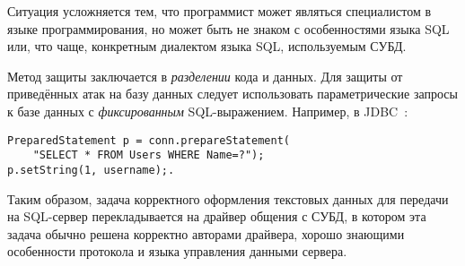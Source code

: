 Ситуация усложняется тем, что программист может являться специалистом в языке программирования, но может быть не знаком с особенностями языка SQL или, что чаще, конкретным диалектом языка SQL, используемым СУБД.

Метод защиты заключается в \emph{разделении} кода и данных. Для защиты от приведённых атак на базу данных следует использовать параметрические запросы к базе данных с \emph{фиксированным} SQL-выражением. Например, в JDBC~\cite{jdbc:2006}:
\begin{verbatim}
PreparedStatement p = conn.prepareStatement(
    "SELECT * FROM Users WHERE Name=?");
p.setString(1, username);.
\end{verbatim}

Таким образом, задача корректного оформления текстовых данных для передачи на SQL-сервер перекладывается на драйвер общения с СУБД, в котором эта задача обычно решена корректно авторами драйвера, хорошо знающими особенности протокола и языка управления данными сервера.

